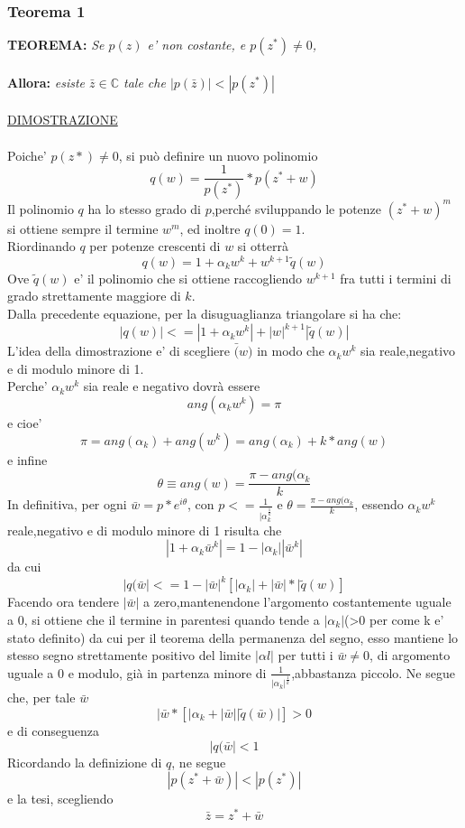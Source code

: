 \documentclass[fontsize = 20px, paper = a4]{article}
\begin{document}
\subsubsection{Teorema 1}
\textbf{TEOREMA: } \emph{Se $p(z)$ e' non costante, e $p(z^*) \neq 0$,}\\ \\
\textbf{Allora:} \emph{esiste $\bar{z} \in \mathbb{C}$ tale che $|p(\bar{z})| < |p(z^*)|$ }\\ \\
\underline{DIMOSTRAZIONE} \\ \\
Poiche'  $p(z*) \neq 0$, si può definire un nuovo polinomio
$$q(w) = \frac{1}{p(z^*)}* p(z^* + w) $$
Il polinomio $q$ ha lo stesso grado di $p$,perché  sviluppando le potenze $(z^* + w)^m$ si ottiene sempre il termine $w^m$, ed inoltre $q(0) = 1$.\\
Riordinando $q$ per potenze crescenti di $w$ si otterrà
$$q(w) = 1 + \alpha_{k}w^k +w^{k+1}\tilde{q}(w)$$
Ove $\tilde{q}(w)$ e' il polinomio che si ottiene raccogliendo $w^{k+1}$ fra tutti i termini di grado strettamente maggiore di $k$.\\
Dalla precedente equazione, per la disuguaglianza triangolare si ha che:
$$|q(w)| <= |1 + \alpha_{k}w^k| + |w|^{k+1} |\tilde{q}(w)|$$
L'idea della dimostrazione e' di scegliere $\bar(w)$ in modo che $\alpha_{k}w^k$ sia reale,negativo e di modulo minore di 1.\\
Perche' $\alpha_{k}w^k$ sia reale e negativo dovrà essere 
$$ang(\alpha_{k}w^k) = \pi $$
e cioe'
$$\pi = ang(\alpha_{k}) + ang(w^k) = ang(\alpha_{k}) + k*ang(w) $$
e infine
$$\theta \equiv ang(w) = \frac{\pi - ang(\alpha_{k}}{k}$$
In definitiva, per ogni $\bar{w} = p*e^{i\theta}$, con $p <= \frac{1}{|\alpha_{k}^{\frac{1}{k}}}$ e $\theta = \frac{\pi - ang(\alpha_{k}}{k}$, essendo $\alpha_{k}w^{k}$ reale,negativo e di modulo minore di 1 risulta che 
$$|1 + \alpha_{k}\bar{w}^k| = 1 - |\alpha_{k}||\bar{w}^k|$$
da cui 
$$|q(\bar{w}| <= 1 - |\bar{w}|^k [|\alpha_{k}|+ |\bar{w}|*|\tilde{q}(w)]$$
Facendo ora tendere $|\bar{w}|$ a zero,mantenendone l'argomento costantemente uguale a 0, si ottiene che il termine in parentesi quando tende a $|\alpha_{k}|$(>0 per come k e' stato definito) da cui per il teorema della permanenza del segno, esso mantiene lo stesso segno strettamente positivo del limite $|\alpha{l}|$ per tutti i $\bar{w} \neq 0$, di argomento uguale a 0 e modulo, già in partenza minore di $\frac{1}{|\alpha_{k}|^{\frac{1}{k}}}$,abbastanza piccolo. Ne segue che, per tale $\bar{w}$
$$|\bar{w}*[|\alpha_{k} + |\bar{w}||\tilde{q}(\bar{w})|] > 0$$
e di conseguenza
$$|q(\bar{w}| < 1$$
Ricordando la definizione di $q$, ne segue
$$|p(z^* + \bar{w})| < |p(z^*)|$$
e la tesi, scegliendo
$$\bar{z} = z^* + \bar{w}$$
\end{document}
